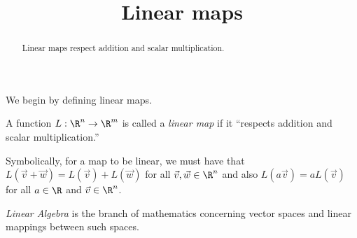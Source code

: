 \documentclass{ximera}
\title{Linear maps}
\begin{document}
\begin{abstract}
  Linear maps respect addition and scalar multiplication.
\end{abstract}

We begin by defining linear maps.

\begin{definition}
  A function $L: \R^n \to \R^m$ is called a \textit{linear map} if it
  ``respects addition and scalar multiplication.''

  Symbolically, for a map to be linear, we must have that
  $L(\vec{v}+\vec{w}) = L(\vec{v})+L(\vec{w})$ for all
  $\vec{v},\vec{w} \in \R^n$ and also $L(a\vec{v}) = a L(\vec{v})$ for
  all $a \in \R$ and $\vec{v}\in \R^n$.
\end{definition}


\begin{definition}
	\textit{Linear Algebra} is the branch of mathematics concerning vector spaces and linear mappings between such spaces.
\end{definition}
\end{document}
